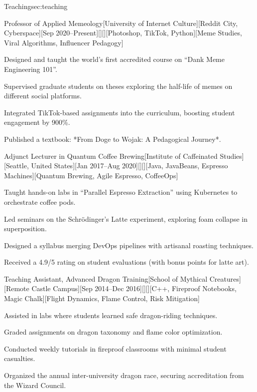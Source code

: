 \documentclass[10pt, letterpaper, extended ]{i-am-developer}
\begin{document}
\begin{devCVSection}{Teaching}{sec:teaching}
  \begin{devRole}{Professor of Applied Memeology}[University of
    Internet Culture][Reddit City, Cyberspace][Sep
    2020--Present][\faGraduationCap][\faMapMarker][Photoshop, TikTok,
    Python][Meme Studies, Viral Algorithms, Influencer Pedagogy]
    \begin{devItemize}
    \item Designed and taught the world’s first accredited course on
      “Dank Meme Engineering 101”.
    \item Supervised graduate students on theses exploring the
      half-life of memes on different social platforms.
    \item Integrated TikTok-based assignments into the curriculum,
      boosting student engagement by 900\%.
    \item Published a textbook: *From Doge to Wojak: A Pedagogical Journey*.
    \end{devItemize}
  \end{devRole}

  \begin{devRole}{Adjunct Lecturer in Quantum Coffee
    Brewing}[Institute of Caffeinated Studies][Seattle, United
    States][Jan 2017--Aug 2020][\faCoffee][\faMapMarker][Java,
    JavaBeans, Espresso Machines][Quantum Brewing, Agile Espresso, CoffeeOps]
    \begin{devItemize}
    \item Taught hands-on labs in “Parallel Espresso Extraction”
      using Kubernetes to orchestrate coffee pods.
    \item Led seminars on the Schrödinger’s Latte experiment,
      exploring foam collapse in superposition.
    \item Designed a syllabus merging DevOps pipelines with artisanal
      roasting techniques.
    \item Received a 4.9/5 rating on student evaluations (with bonus
      points for latte art).
    \end{devItemize}
  \end{devRole}

  \begin{devRole}{Teaching Assistant, Advanced Dragon
    Training}[School of Mythical Creatures][Remote Castle Campus][Sep
    2014--Dec 2016][\faFire][\faMapMarker][C++, Fireproof Notebooks,
    Magic Chalk][Flight Dynamics, Flame Control, Risk Mitigation]
    \begin{devItemize}
    \item Assisted in labs where students learned safe dragon-riding techniques.
    \item Graded assignments on dragon taxonomy and flame color optimization.
    \item Conducted weekly tutorials in fireproof classrooms with
      minimal student casualties.
    \item Organized the annual inter-university dragon race, securing
      accreditation from the Wizard Council.
    \end{devItemize}
  \end{devRole}


\end{devCVSection}
\end{document}
